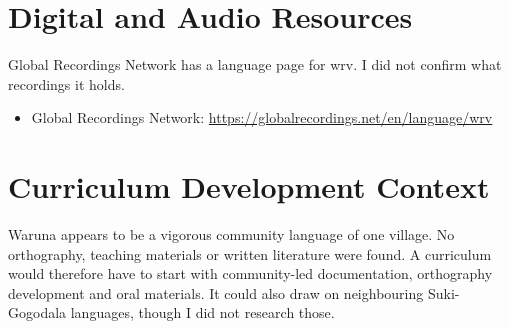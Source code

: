 \documentclass[12pt]{article}
\begin{document}
\section{Digital and Audio Resources}
Global Recordings Network has a language page for wrv. I did not confirm what recordings it holds.
\begin{itemize}
\item Global Recordings Network: \url{https://globalrecordings.net/en/language/wrv}
\end{itemize}

\section{Curriculum Development Context}
Waruna appears to be a vigorous community language of one village. No orthography, teaching materials or written literature were found. A curriculum would therefore have to start with community-led documentation, orthography development and oral materials. It could also draw on neighbouring Suki-Gogodala languages, though I did not research those.
\end{document}
